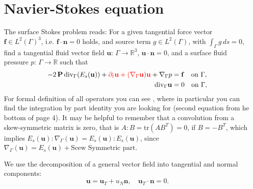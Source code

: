 \documentclass{article}
\newcommand{\R}{\mathbb R}
\newcommand{\bP}{\mathbf P}
\newcommand{\blf}{\mathbf f}
\newcommand{\bn}{\mathbf n}
\newcommand{\bu}{\mathbf u}
\newcommand{\divG}{{\mathop{\,\rm div}}_{\Gamma}}
\begin{document}
\newpage
\section{Navier-Stokes equation}


The surface Stokes problem reads: For a given tangential force vector $\mathbf{f} \in L^2(\Gamma)^3$, i.e. $\mathbf{f}\cdot\bn=0$ holds, and
source term $g\in L^2(\Gamma)$, with $\int_\Gamma g\, ds=0$, find a tangential fluid vector field $\bu:\, \Gamma \to \R^3$, $\bu\cdot\bn =0$, and a surface fluid pressure $p:\, \Gamma \to \R$  such that
\begin{align} %
  - 2\,\bP \divG (E_s(\bu))+{\color{red}\partial_t\mathbf{u}+ (\nabla_\Gamma \mathbf{u})\mathbf{u}} +\nabla_\Gamma p &=  \blf \quad \text{on}~\Gamma,  \label{strongform-1} \\
  \divG \bu & =0 \quad \text{on}~\Gamma, \label{strongform-2}
\end{align}
{\color{blue} For formal definition of all operators you can see \cite{jankuhn2018incompressible}, where in particular you can find the integration by part identity you are looking for (second equation from he bottom of page 4). It may be helpful to remember that a convolution from a skew-symmetric matrix is zero, that is $A:B=\mbox{tr}(AB^T)=0$, if $B=-B^T$, which implies $E_s(\bu):\nabla_\Gamma(\bu)= E_s(\bu):E_s(\bu)$, since $\nabla_\Gamma(\bu)=E_s(\bu)+\text{Scew Symmetric part}$.\\}


We use the  decomposition of a general vector field into tangential and normal components:
\begin{equation}\label{u_T_N}
\bu = \bu_T + u_N\bn,\quad \bu_T\cdot\bn=0.
\end{equation}
\end{document}
